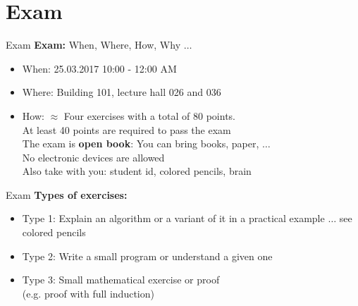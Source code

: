 \section{Exam}

\begin{frame}{Exam}
  \textbf{Exam:} When, Where, How, Why $\ldots$
  \vspace{1em}
  \begin{itemize}
    \item
      When: {\color{Mittel-Gruen}25.03.2017 10:00 - 12:00 AM}
    \item
      Where: {\color{Mittel-Gruen}Building 101, lecture hall 026 and 036}
    \item
      How:
      $\approx$ Four exercises with a total of 80 points.\\
      At least 40 points are required to pass the exam\\
      The exam is \textbf{open book}: You can bring books, paper, $\ldots$\\
      No electronic devices are allowed\\
      Also take with you: {\color{Mittel-Gruen}student id},
      {\color{Mittel-Gruen}colored pencils}, {\color{Mittel-Gruen}brain}
  \end{itemize}
\end{frame}


\begin{frame}{Exam}
  \textbf{Types of exercises:}
  \begin{itemize}
    \item
      Type 1: Explain an algorithm or a variant of it in a practical example
      $\ldots$ see {\color{Mittel-Gruen}colored pencils}
    \item
      Type 2: Write a small program or understand a given one
    \item
      Type 3: Small mathematical exercise or proof\\
      (e.g. proof with full induction)
  \end{itemize}
\end{frame}

